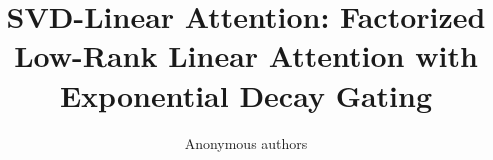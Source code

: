 \title{\textbf{SVD-Linear Attention: Factorized Low-Rank Linear Attention with Exponential Decay Gating}}

\author{Anonymous authors}
